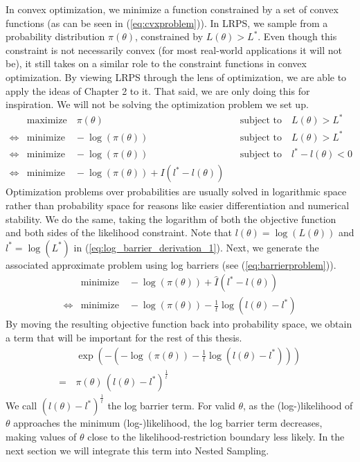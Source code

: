 \documentclass[12pt, a4paper]{report}
\begin{document}
In convex optimization, we minimize a function constrained by a set of convex functions (as can be seen in (\ref{eq:cvxproblem})).
In LRPS, we sample from a probability distribution $\pi(\theta)$, constrained by $L(\theta) > L^*$.
Even though this constraint is not necessarily convex (for most real-world applications it will not be), it still takes on a similar role to the constraint functions in convex optimization.
By viewing LRPS through the lens of optimization, we are able to apply the ideas of Chapter 2 to it.
That said, we are only doing this for inspiration.
We will not be solving the optimization problem we set up.
\begin{align}
    &\textrm{maximize} \quad \pi(\theta) &&\textrm{subject to} \quad L(\theta) > L^* \nonumber\\
    \iff &\textrm{minimize} \quad -\log(\pi(\theta)) &&\textrm{subject to} \quad L(\theta) > L^* \nonumber\\
    \iff &\textrm{minimize} \quad -\log(\pi(\theta)) &&\textrm{subject to} \quad l^* - l(\theta) < 0 \label{eq:log_barrier_derivation_1}\\
    \iff &\textrm{minimize} \quad -\log(\pi(\theta)) + I(l^* - l(\theta)) \nonumber
\end{align}
Optimization problems over probabilities are usually solved in logarithmic space rather than probability space for reasons like easier differentiation and numerical stability.
We do the same, taking the logarithm of both the objective function and both sides of the likelihood constraint.
Note that $l(\theta) = \log(L(\theta))$ and $l^* = \log(L^*)$ in (\ref{eq:log_barrier_derivation_1}).
Next, we generate the associated approximate problem using log barriers (see (\ref{eq:barrierproblem})).
\begin{align*}
    &\textrm{minimize} \quad -\log(\pi(\theta)) + \hat{I}(l^* - l(\theta)) \\
    \iff &\textrm{minimize} \quad -\log(\pi(\theta)) - \frac{1}{t}\log(l(\theta) - l^*)
\end{align*}
By moving the resulting objective function back into probability space, we obtain a term that will be important for the rest of this thesis.
\begin{align}
    &\exp(-(-\log(\pi(\theta)) - \frac{1}{t}\log(l(\theta) - l^*))) \nonumber\\
    = \, &\pi(\theta) \, (l(\theta) - l^*)^{\frac{1}{t}} \label{eq:log_barrier_term}
\end{align}
We call $(l(\theta) - l^*)^\frac{1}{t}$ the log barrier term.
For valid $\theta$, as the (log-)likelihood of $\theta$ approaches the minimum (log-)likelihood, the log barrier term decreases, making values of $\theta$ close to the likelihood-restriction boundary less likely.
In the next section we will integrate this term into Nested Sampling.
\end{document}
